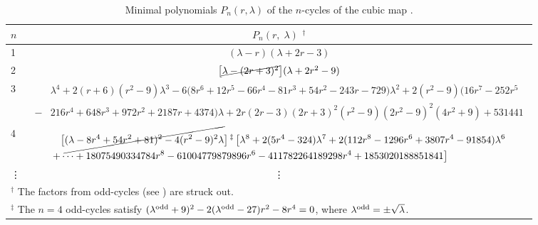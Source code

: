 \documentclass[preprint]{revtex4-1}
\begin{document}
\begin{table}[h]\footnotesize
  \caption{
  Minimal polynomials $P_n(r, \lambda)$ of
  the $n$-cycles of the cubic map .
  }
\begin{center}
\begin{tabular}{lc}
\hline
  $n$
& $P_n(r, \; \lambda)$ $^\dagger$
\\
\hline
1
&
$(\lambda - r) (\lambda + 2 r - 3)$
\\
2
&
  $
  \big[
  \cancel{\lambda - (2r+3)^2}
  \big]
  (\lambda + 2r^2 - 9)
  $
\\
3
&
$\begin{aligned}
  &\lambda^4
  + 2 (r+6)(r^2-9) \lambda^3
  -6 \big(8 r^6+12 r^5-66 r^4-81 r^3+54 r^2-243 r-729\big)
  \lambda^2
+2 (r^2-9) \big(16 r^7-252 r^5\\
-&216 r^4 +648 r^3+972 r^2+2187 r+4374\big) \lambda
+2 r (2r-3) (2 r+3)^2 (r^2-9) (2 r^2 - 9)^2 (4 r^2+9) + 531441
\end{aligned}$
\\
4
&
\begin{minipage}{.97\linewidth}
\vspace*{1mm}
$\begin{aligned}
&\big[ \cancel{
  (\lambda-8r^4+54r^2+81)^2
-4 (r^2-9)^2 \lambda
} \big]
\,^\ddagger\,
\big[
\lambda^8
+2(5 r^4-324) \lambda^7
+2(112 r^8-1296 r^6+3807 r^4-91854) \lambda^6 \\
+&\dots
+18075490334784 r^8
-61004779879896 r^6
-411782264189298 r^4
+1853020188851841
\big]
\end{aligned}$
\end{minipage}
\\
\vdots & \vdots
\\
\hline
\multicolumn{2}{p{\textwidth}}{
$^\dagger$
The factors from odd-cycles (see {oddcycle}) are struck out.
}\\
\multicolumn{2}{p{\textwidth}}{
$^\ddagger$
The $n = 4$ odd-cycles satisfy
$(\lambda^{\mathrm{odd}} + 9)^2 - 2(\lambda^{\mathrm{odd}}-27) r^2 - 8 r^4 = 0$,
  where $\lambda^{\mathrm{odd}}=\pm\sqrt\lambda$.
} \\
\hline
\end{tabular}
\end{center}
\label{tab:cubpolygen}
\end{table}
\end{document}
